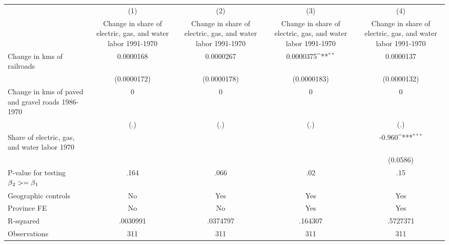 {
\def\sym#1{\ifmmode^{#1}\else\(^{#1}\)\fi}
\begin{tabular}{l*{4}{c}}
\hline\hline
                &\multicolumn{1}{c}{(1)}&\multicolumn{1}{c}{(2)}&\multicolumn{1}{c}{(3)}&\multicolumn{1}{c}{(4)}\\
                &\multicolumn{1}{c}{Change in share of electric, gas, and water labor 1991-1970}&\multicolumn{1}{c}{Change in share of electric, gas, and water labor 1991-1970}&\multicolumn{1}{c}{Change in share of electric, gas, and water labor 1991-1970}&\multicolumn{1}{c}{Change in share of electric, gas, and water labor 1991-1970}\\
\hline
Change in kms of railroads&0.0000168         &0.0000267         &0.0000375\sym{**} &0.0000137         \\
                &(0.0000172)         &(0.0000178)         &(0.0000183)         &(0.0000132)         \\
[1em]
Change in kms of paved and gravel roads 1986-1970&        0         &        0         &        0         &        0         \\
                &      (.)         &      (.)         &      (.)         &      (.)         \\
[1em]
Share of electric, gas, and water labor 1970&                  &                  &                  &   -0.960\sym{***}\\
                &                  &                  &                  & (0.0586)         \\
\hline
P-value for testing $\beta\\_2 >= \beta\\_1$&     .164         &     .066         &      .02         &      .15         \\
Geographic controls&       No         &      Yes         &      Yes         &      Yes         \\
Province FE     &       No         &       No         &      Yes         &      Yes         \\
R-squared       & .0030991         & .0374797         &  .164307         & .5727371         \\
Observations    &      311         &      311         &      311         &      311         \\
\hline\hline
\end{tabular}
}

